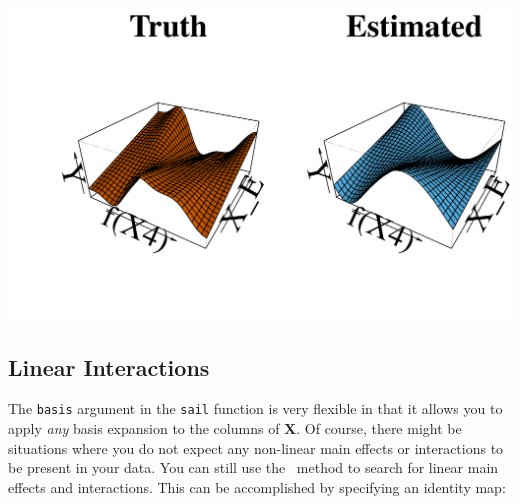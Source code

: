 \begin{knitrout}\scriptsize
	\color{fgcolor}\begin{kframe}
		\begin{alltt}
			\hlopt{$}  \hlopt{$}  \hlstd{=} \hlstd{,}
			 \hlopt{$}
			 \hlopt{$}
			 \hlstd{=} \hlstd{)}
		\end{alltt}
	\end{kframe}
	
	{\centering \includegraphics[width=1\linewidth]{figs/sail-inter-eff-1} 
		
	}
	
	
	
\end{knitrout}



\subsection{Linear Interactions}

The \texttt{basis} argument in the \texttt{sail} function is very flexible in that it allows you to apply \textit{any} basis expansion to the columns of $\mathbf{X}$. Of course, there might be situations where you do not expect any non-linear main effects or interactions to be present in your data. You can still use the \sail ~method to search for linear main effects and interactions. This can be accomplished by specifying an identity map:

\begin{knitrout}\scriptsize
	\color{fgcolor}\begin{kframe}
		\begin{alltt}
			 \hlkwb{<-} \hlstd{(}\hlstd{) i}
		\end{alltt}
	\end{kframe}
\end{knitrout}

